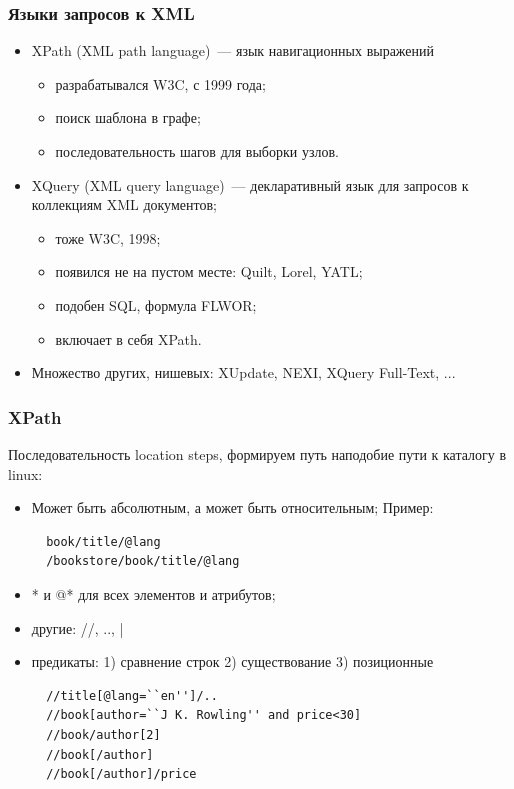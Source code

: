 \documentclass{beamer}
\begin{document}
\begin{frame}
\frametitle{Языки запросов к XML \cite{Hidders2009}}

\begin{itemize}
  \setlength\itemsep{1em}
  \item XPath (XML path language)~--- язык навигационных выражений
  \begin{itemize}
    \item разрабатывался W3C, с 1999 года;
    \item поиск шаблона в графе;
    \item последовательность шагов для выборки узлов.
  \end{itemize}
  \item XQuery (XML query language)~--- декларативный язык для запросов к коллекциям XML документов;
  \begin{itemize}
    \item тоже W3C, 1998;
    \item появился не на пустом месте: Quilt, Lorel, YATL;
    \item подобен SQL, формула FLWOR;
    \item включает в себя XPath.
  \end{itemize}
  
  \item Множество других, нишевых: XUpdate, NEXI, XQuery Full-Text, ...
\end{itemize}
\end{frame}

\begin{frame}[fragile]
\frametitle{XPath}

Последовательность location steps, формируем путь наподобие пути к каталогу в linux:

\lstset{language=XML}
\begin{itemize}
  \setlength\itemsep{1em}
  \item Может быть абсолютным, а может быть относительным;
  Пример: 
  \begin{lstlisting}
  book/title/@lang
  /bookstore/book/title/@lang\end{lstlisting}  
  \item * и @* для всех элементов и атрибутов;
  \item другие: //, .., |
  \item предикаты: 1) сравнение строк 2) существование 3) позиционные
  \begin{lstlisting}
  //title[@lang=``en'']/..
  //book[author=``J K. Rowling'' and price<30]
  //book/author[2]
  //book[/author]
  //book[/author]/price\end{lstlisting}  
  
\end{itemize}
\end{frame}
\end{document}
